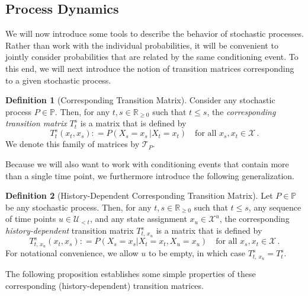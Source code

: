 \documentclass[10pt,a4paper]{paper}
\theoremstyle{definition}
\newtheorem{definition}{Definition}
\newcommand{\reals}{\mathbb{R}}
\newcommand{\realsnonneg}{\reals_{\geq 0}}
\newcommand{\states}{\mathcal{X}}
\newcommand{\processes}{\mathbb{P}}
\newcommand{\coloneqq}{:\!=}
\begin{document}
\subsection{Process Dynamics}\label{sec:dynamics}

We will now introduce some tools to describe the behavior of stochastic processes. Rather than work with the individual probabilities, it will be convenient to jointly consider probabilities that are related by the same conditioning event. To this end, we will next introduce the notion of transition matrices corresponding to a given stochastic process.

\begin{definition}[Corresponding Transition Matrix]\label{def:trans_matrix}
Consider any stochastic process $P\in\processes$. Then, for any $t,s\in\realsnonneg$ such that $t\leq s$, the \emph{corresponding transition matrix} $T_t^s$ is a matrix that is defined by
\begin{equation*}
T_t^s(x_t, x_s) \coloneqq P(X_s=x_s\,\vert X_t=x_t)\quad\text{for all $x_s,x_t\in\states$}\,.
\end{equation*}
We denote this family of matrices by $\mathcal{T}_P$.%
\end{definition}

Because we will also want to work with conditioning events that contain more than a single time point, we furthermore introduce the following generalization.

\begin{definition}[History-Dependent Corresponding Transition Matrix]
Let $P\in\processes$ be any stochastic process. Then, for any $t,s\in\realsnonneg$ such that $t\leq s$, any sequence of time points $u\in\mathcal{U}_{<t}$, and any state assignment $x_u\in\states^u$, the corresponding \emph{history-dependent} transition matrix $T_{t,\,x_u}^s$ is a matrix that is defined by
\begin{equation*}
T^s_{t,\,x_u}(x_t,x_s)
\coloneqq
P(X_s=x_s\vert X_t=x_t, X_u=x_u)\quad\text{for all $x_s,x_t\in\states$}\,.
\end{equation*}
For notational convenience, we allow $u$ to be empty, in which case $T_{t,\,x_u}^s=T_t^s$.
\end{definition}

The following proposition establishes some simple properties of these corresponding (history-dependent) transition matrices.
\end{document}
